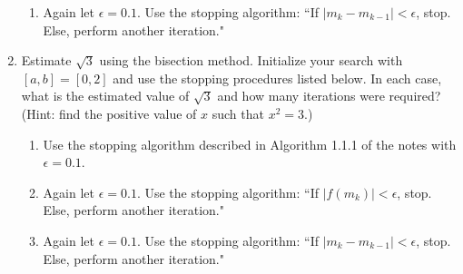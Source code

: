 \documentclass[12pt]{article}
\newif\ifans
\begin{document}
\begin{enumerate}
\begin{enumerate}
\item Again let $\epsilon=0.1$.  Use the stopping algorithm: ``If $|m_k-m_{k-1}|<\epsilon$, stop.  Else, perform another iteration."

\ifans\fbox{The solution is approximately 0.6875 after 7 iterations.}\fi

\end{enumerate}

\newpage

\item Estimate $\sqrt{3}$ using the bisection method.  Initialize your search with $[a,b]=[0,2]$ and use the stopping procedures listed below.  In each case, what is the estimated value of $\sqrt{3}$ and how many iterations were required?  (Hint: find the positive value of $x$ such that $x^2=3$.)

\begin{enumerate}

\item Use the stopping algorithm described in Algorithm 1.1.1 of the notes with $\epsilon=0.1$.

\ifans\fbox{The solution is approximately 1.6875 after 5 iterations.}\fi

\item Again let $\epsilon=0.1$.  Use the stopping algorithm: ``If $|f(m_k)|<\epsilon$, stop.  Else, perform another iteration."

\ifans\fbox{The solution is approximately 1.75 after 3 iterations.}\fi

\item Again let $\epsilon=0.1$.  Use the stopping algorithm: ``If $|m_k-m_{k-1}|<\epsilon$, stop.  Else, perform another iteration."

\ifans\fbox{The solution is approximately 1.6875 after 5 iterations.}\fi

\end{enumerate}


\end{enumerate}
\end{document}
